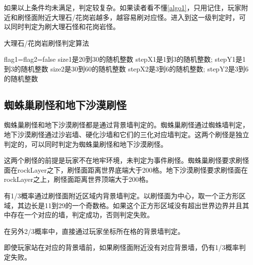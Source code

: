 如果以上条件均未满足，判定较复杂。如果读者看不懂\autoref{algo1}，只用记住，玩家附近和刷怪面附近大理石/花岗岩越多，越容易刷对应怪。进入到这一级判定时，可以同时判定为刷大理石怪和花岗岩怪。

\begin{algorithm}[!h]
\caption{大理石/花岗岩刷怪判定算法}\label{algo1}
flag1=flag2=false\;
size1是20到30的随机整数\; 
stepX1是1到3的随机整数; stepY1是1到3的随机整数\;
size2是30到60的随机整数\; 
stepX2是3到6的随机整数; stepY2是3到6的随机整数\;
\end{algorithm}

\subsection{蜘蛛巢刷怪和地下沙漠刷怪}
蜘蛛巢刷怪和地下沙漠刷怪都是通过背景墙判定的。蜘蛛巢刷怪通过蜘蛛墙判定，地下沙漠刷怪通过沙岩墙、硬化沙墙和它们的三化对应墙判定。这两个刷怪是独立判定的，可以同时判定为蜘蛛巢刷怪和地下沙漠刷怪。

这两个刷怪的前提是玩家不在地牢环境，未判定为事件刷怪。蜘蛛巢刷怪要求刷怪面在rockLayer之下，刷怪面距离世界底端大于200格。地下沙漠刷怪要求刷怪面在rockLayer之上，刷怪面距离世界顶端大于200格。

有1/3概率通过刷怪面附近区域内背景墙判定。以刷怪面为中心，取一个正方形区域，其边长是11到29的一个奇数格。如果这个正方形区域没有超出世界边界并且其中存在一个对应的墙，判定成功，否则判定失败。

在另外2/3概率中，直接通过玩家坐标所在格的背景墙判定。

\begin{remark}
即使玩家站在对应的背景墙前，如果刷怪面附近没有对应背景墙，仍有1/3概率判定失败。
\end{remark}

